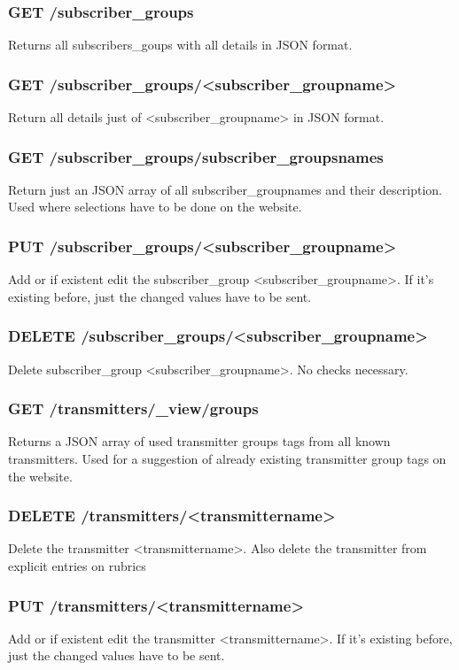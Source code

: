 \subsubsection{GET /subscriber\_groups}
Returns all subscribers\_goups with all details in JSON format.

\subsubsection{GET /subscriber\_groups/<subscriber\_groupname>}
Return all details just of <subscriber\_groupname> in JSON format.

\subsubsection{GET /subscriber\_groups/subscriber\_groupsnames}
Return just an JSON array of all subscriber\_groupnames and their description. Used where selections have to be done on the website.

\subsubsection{PUT /subscriber\_groups/<subscriber\_groupname>}
Add or if existent edit the subscriber\_group <subscriber\_groupname>. If it's existing before, just the changed values have to be sent.

\subsubsection{DELETE /subscriber\_groups/<subscriber\_groupname>}
Delete subscriber\_group <subscriber\_groupname>. No checks necessary.

\subsubsection{GET /transmitters/\_view/groups}
Returns a JSON array of used transmitter groups tags from all known transmitters. Used for a suggestion of already existing transmitter group tags on the website.

\subsubsection{DELETE /transmitters/<transmittername>}
Delete the transmitter <transmittername>. Also delete the transmitter from explicit entries on rubrics

\subsubsection{PUT /transmitters/<transmittername>}
Add or if existent edit the transmitter <transmittername>. If it's existing before, just the changed values have to be sent.

